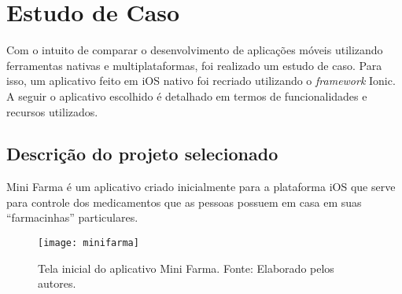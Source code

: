 \chapter{Estudo de Caso} \label{cap:estudodecaso}

Com o intuito de comparar o desenvolvimento de aplicações móveis utilizando ferramentas nativas e multiplataformas, 
foi realizado um estudo de caso. Para isso, um aplicativo feito em iOS 
nativo foi recriado utilizando o \textit{framework} Ionic. A seguir o aplicativo escolhido é detalhado em termos de funcionalidades e recursos utilizados. 

\section{Descrição do projeto selecionado} \label{sec:descricaodoprojeto}

Mini Farma é um aplicativo criado inicialmente para a plataforma iOS que serve para controle dos medicamentos que as 
pessoas possuem em casa em suas ``farmacinhas'' particulares.

\begin{figure}[h]
  \centering
    \texttt{[image: minifarma]}
    \caption[Tela inicial do aplicativo Mini Farma]{ Tela inicial do aplicativo Mini Farma. Fonte: Elaborado pelos autores.}
	\label{fig:minifarma}
\end{figure}

